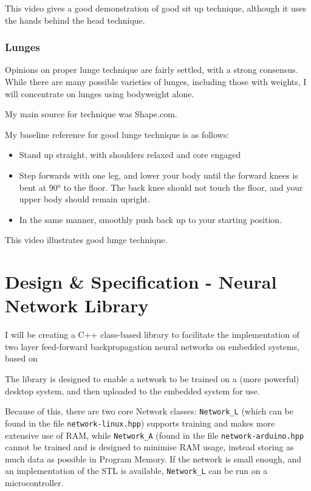 \documentclass[a4paper]{article}
\begin{document}
This video\cite{bgref23} gives a good demonstration of good sit up technique, although it uses the hands behind the head technique.

\subsubsection{Lunges}

Opinions on proper lunge technique are fairly settled, with a strong consensus. While there are many possible varieties of lunges, including those with weights, I will concentrate on lunges using bodyweight alone.

My main source for technique was Shape.com\cite{bgref24}.

My baseline reference for good lunge technique is as follows:

\begin{itemize}
    \item Stand up straight, with shoulders relaxed and core engaged
    \item Step forwards with one leg, and lower your body until the forward knees is bent at 90° to the floor. The back knee should not touch the floor, and your upper body should remain upright.
    \item In the same manner, smoothly push back up to your starting position.
\end{itemize}

This video\cite{bgref25} illustrates good lunge technique.

\newpage
\section{Design \& Specification - Neural Network Library}

I will be creating a C++ class-based library to facilitate the implementation of two layer feed-forward backpropagation neural networks on embedded systems, based on 

The library is designed to enable a network to be trained on a (more powerful) desktop system, and then uploaded to the embedded system for use.

Because of this, there are two core Network classes: \lstinline{Network_L} (which can be found in the file \lstinline{network-linux.hpp}) supports training and makes more extensive use of RAM, while \lstinline{Network_A} (found in the file \lstinline{network-arduino.hpp} cannot be trained and is designed to minimise RAM usage, instead storing as much data as possible in Program Memory. If the network is small enough, and an implementation of the STL is available, \lstinline{Network_L} can be run on a microcontroller.
\end{document}
